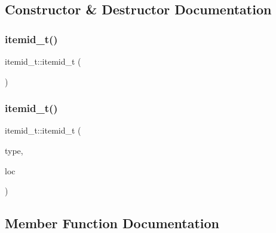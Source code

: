 \subsection{Constructor \& Destructor Documentation}
\mbox{\label{classitemid__t_ab530695e150aa701f2ec41c6ef7546d7}} 
\subsubsection{\texorpdfstring{itemid\+\_\+t()}{itemid\_t()}\hspace{0.1cm}{\footnotesize\ttfamily [1/2]}}
{\footnotesize\ttfamily itemid\+\_\+t\+::itemid\+\_\+t (\begin{DoxyParamCaption}{ }\end{DoxyParamCaption})\hspace{0.3cm}{\ttfamily [inline]}}

\mbox{\label{classitemid__t_ac77c788e83ad418e67d0c87b15d602d3}} 
\subsubsection{\texorpdfstring{itemid\+\_\+t()}{itemid\_t()}\hspace{0.1cm}{\footnotesize\ttfamily [2/2]}}
{\footnotesize\ttfamily itemid\+\_\+t\+::itemid\+\_\+t (\begin{DoxyParamCaption}\item[{\hyperlink{helper_8h_a301eca6e81ebe56d6e6ff16eb4a148ad}{Data\+\_\+type}}]{type,  }\item[{void $\ast$}]{loc }\end{DoxyParamCaption})\hspace{0.3cm}{\ttfamily [inline]}}



\subsection{Member Function Documentation}
\mbox{\label{classitemid__t_ad2afc0d0875953bace22ee5513acfee5}} 
